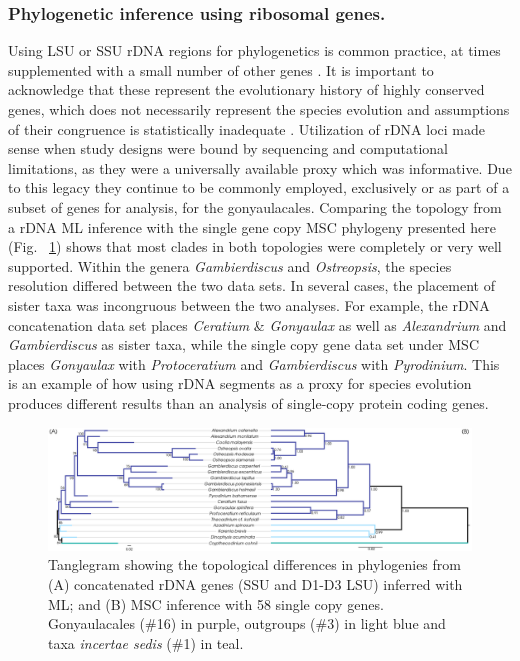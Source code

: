 \documentclass[fleqn,10pt,lineno]{wlpeerj} %
\begin{document}
\subsubsection*{Phylogenetic inference using ribosomal genes.}
Using LSU or SSU rDNA regions for phylogenetics is common practice, at times supplemented with a small number of other genes \cite{shalchian2006combined,zhang2007three,saldarriaga2004molecular,murray2005improving,hoppenrath2010dinoflagellate}. 
It is important to acknowledge that these represent the evolutionary history of highly conserved genes, which does not necessarily represent the species evolution and assumptions of their congruence is statistically inadequate \cite{degnan2009gene}.
Utilization of rDNA loci made sense when study designs were bound by sequencing and computational limitations, as they were a universally available proxy which was informative. 
Due to this legacy they continue to be commonly employed, exclusively or as part of a subset of genes for analysis, for the gonyaulacales. 
Comparing the topology from a rDNA ML inference with the single gene copy MSC phylogeny presented here (Fig. ~\ref{fig:tanglerDNA}) shows that most clades in both topologies were completely or very well supported. 
Within the genera \emph{Gambierdiscus} and \emph{Ostreopsis}, the species resolution differed between the two data sets. 
In several cases, the placement of sister taxa was incongruous between the two analyses. 
For example, the rDNA concatenation data set places \emph{Ceratium} \& \emph{Gonyaulax} as well as \emph{Alexandrium} and \emph{Gambierdiscus} as sister taxa, while the single copy gene data set under MSC places \emph{Gonyaulax} with \emph{Protoceratium} and \emph{Gambierdiscus} with \emph{Pyrodinium}. 
This is an example of how using rDNA segments as a proxy for species evolution produces different results than an analysis of single-copy protein coding genes.

\begin{figure}[ht]
\centering
\includegraphics[width=\linewidth]{gonya-figs/MSC-BI-vs-rDNA-ML.png} 
\caption{Tanglegram showing the topological differences in phylogenies from (A) concatenated rDNA genes (SSU and D1-D3 LSU) inferred with ML; and (B) MSC inference with 58 single copy genes. Gonyaulacales (\#16) in purple, outgroups (\#3) in light blue and taxa \textit{incertae sedis} (\#1) in teal.} 
\label{fig:tanglerDNA}
\end{figure} 
\end{document}
